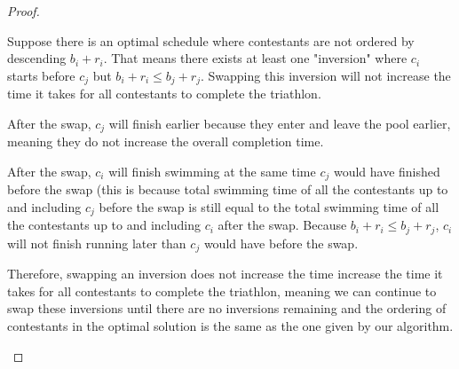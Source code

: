 \documentclass[11pt, oneside]{article}   	%
\begin{document}
\begin{proof}
\begin{description}
Suppose there is an optimal schedule where contestants are not ordered by descending $b_i + r_i$. That means there exists at least one "inversion" where $c_i$ starts before $c_j$ but $b_i+r_i \leq b_j+r_j$. Swapping this inversion will not increase the time it takes for all contestants to complete the triathlon.

After the swap, $c_j$ will finish earlier because they enter and leave the pool earlier, meaning they do not increase the overall completion time.

After the swap, $c_i$ will finish swimming at the same time $c_j$ would have finished before the swap (this is because total swimming time of all the contestants up to and including $c_j$ before the swap is still equal to the total swimming time of all the contestants up to and including $c_i$ after the swap. Because $b_i+r_i \leq b_j+r_j$, $c_i$ will not finish running later than $c_j$ would have before the swap.

Therefore, swapping an inversion does not increase the time increase the time it takes for all contestants to complete the triathlon, meaning we can continue to swap these inversions until there are no inversions remaining and the ordering of contestants in the optimal solution is the same as the one given by our algorithm. 
\end{description}
\end{proof}
\end{document}
